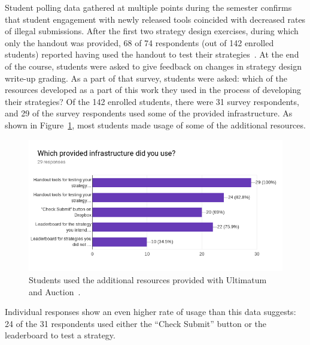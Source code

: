 \documentclass[pageno]{jpaper}
\begin{document}
Student polling data gathered at multiple points during the semester confirms that student engagement with newly released tools coincided with decreased rates of illegal submissions.
After the first two strategy design exercises, during which only the handout was provided, 68 of 74 respondents (out of 142 enrolled students) reported having used the handout to test their strategies~\cite{survey12}.
At the end of the course, students were asked to give feedback on changes in strategy design write-up grading.
As a part of that survey, students were asked: which of the resources developed as a part of this work they used in the process of developing their strategies?
Of the 142 enrolled students, there were 31 survey respondents, and 29 of the survey respondents used some of the provided infrastructure.
As shown in Figure~\ref{fig:usage2}, most students made usage of some of the additional resources.
\begin{figure}[hbt]
  \centering
  \includegraphics[width=0.75\linewidth]{usage2.png}
  \caption{Students used the additional resources provided with Ultimatum and Auction~\cite{survey34}.}\label{fig:usage2}
\end{figure}
Individual responses show an even higher rate of usage than this data suggests: 24 of the 31 respondents used either the ``Check Submit'' button or the leaderboard to test a strategy.
\end{document}
